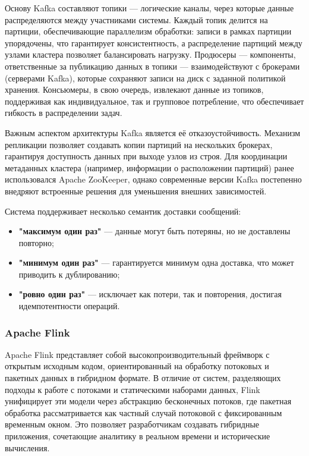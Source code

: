             
            Основу Kafka составляют топики — логические каналы, через которые данные распределяются между участниками системы. Каждый топик делится на партиции, обеспечивающие параллелизм обработки: записи в рамках партиции упорядочены, что гарантирует консистентность, а распределение партиций между узлами кластера позволяет балансировать нагрузку. Продюсеры — компоненты, ответственные за публикацию данных в топики — взаимодействуют с брокерами (серверами Kafka), которые сохраняют записи на диск с заданной политикой хранения. Консьюмеры, в свою очередь, извлекают данные из топиков, поддерживая как индивидуальное, так и групповое потребление, что обеспечивает гибкость в распределении задач.
            
             
            Важным аспектом архитектуры Kafka является её отказоустойчивость. Механизм репликации позволяет создавать копии партиций на нескольких брокерах, гарантируя доступность данных при выходе узлов из строя. Для координации метаданных кластера (например, информации о расположении партиций) ранее использовался Apache ZooKeeper, однако современные версии Kafka постепенно внедряют встроенные решения для уменьшения внешних зависимостей.
            
            
            Система поддерживает несколько семантик доставки сообщений:
            \begin{itemize}
                \item \textbf{"максимум один раз"} — данные могут быть потеряны, но не доставлены повторно;
                \item \textbf{"минимум один раз"} — гарантируется минимум одна доставка, что может приводить к дублированию;
                \item \textbf{"ровно один раз"} — исключает как потери, так и повторения, достигая идемпотентности операций.
            \end{itemize}

        \subsubsection{Apache Flink}
            Apache Flink представляет собой высокопроизводительный фреймворк с открытым исходным кодом, ориентированный на обработку потоковых и пакетных данных в гибридном формате. В отличие от систем, разделяющих подходы к работе с потоками и статическими наборами данных, Flink унифицирует эти модели через абстракцию бесконечных потоков, где пакетная обработка рассматривается как частный случай потоковой с фиксированным временным окном. Это позволяет разработчикам создавать гибридные приложения, сочетающие аналитику в реальном времени и исторические вычисления.
            
